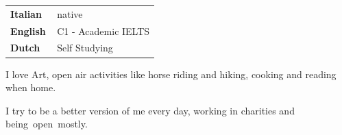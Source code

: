 \documentclass[9pt]{developercv} %
\begin{document}
\begin{minipage}[t]{0.3\textwidth}
	\vspace{-\baselineskip} %

    
	\begin{tabular}{l l}
    \textbf{Italian} \quad \quad & \,native \\
	\textbf{English     } & \,C1 - Academic IELTS\\
    \textbf{Dutch} & \,Self Studying

    \end{tabular}
\end{minipage}
\hfill
\begin{minipage}[t]{0.3\textwidth}
	\vspace{-\baselineskip} %
    
    
	I love Art, open air activities like horse riding and hiking, cooking and reading when home.
\end{minipage}
\hfill
\begin{minipage}[t]{0.3\textwidth}
	\vspace{-\baselineskip} %
	
    I try to be a better version of me \linebreak every day, working in charities and \linebreak \mbox{being open mostly.} \linebreak
\end{minipage}


\vspace{-0.2cm}
\end{document}
